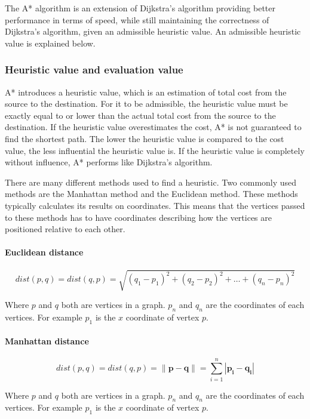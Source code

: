   The A* algorithm is an extension of Dijkstra's algorithm providing better performance in terms of speed, while still maintaining the correctness of Dijkstra's algorithm, given an admissible heuristic value. An admissible heuristic value is explained below.

 
  \subsubsection{Heuristic value and evaluation value}
  A* introduces a heuristic value, which is an estimation of total cost from the source to the destination. For it to be admissible, the heuristic value must be exactly equal to or lower than the actual total cost from the source to the destination. If the heuristic value overestimates the cost, A* is not guaranteed to find the shortest path. The lower the heuristic value is compared to the cost value, the less influential the heuristic value is. If the heuristic value is completely without influence, A* performs like Dijkstra's algorithm.

  There are many different methods used to find a heuristic. Two commonly used methods are the Manhattan method and the Euclidean method. These methods typically calculates its results on coordinates. This means that the vertices passed to these methods has to have coordinates describing how the vertices are positioned relative to each other.

    \paragraph{Euclidean distance}\cite{wiki_euclidean}

  \[
    dist(p, q) = dist(q, p) = \sqrt{(q_{1} - p_{1})^2 + (q_{2} - p_{2})^2 + \dots + (q_{n} - p_{n})^2}
  \]

  Where $p$ and $q$ both are vertices in a graph. $p_{n}$ and $q_{n}$ are the coordinates of each vertices. For example $p_{1}$ is the $x$ coordinate of vertex $p$.

    \paragraph{Manhattan distance}\cite{wiki_manhattan_distance}

  \[
    dist(p, q) = dist(q, p) = \| \mathbf{p} - \mathbf{q} \| = \sum\limits_{i=1}^n | \mathbf{p_{i}} - \mathbf{q_{i}} |
  \]

  Where $p$ and $q$ both are vertices in a graph. $p_{n}$ and $q_{n}$ are the coordinates of each vertices. For example $p_{1}$ is the $x$ coordinate of vertex $p$.


